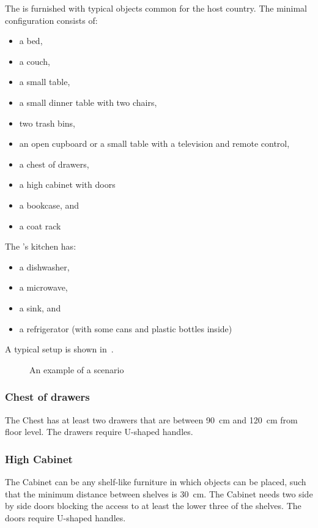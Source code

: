 The \Arena{} is furnished with typical objects common for the host country.
The minimal configuration consists of:
\begin{itemize}
	\item a bed,
	\item a couch,
	\item a small table,
	\item a small dinner table with two chairs,
	\item two trash bins,
	\item an open cupboard or a small table with a television and remote control,
	\item a chest of drawers,
	\item a high cabinet with doors
	\item a bookcase, and
	\item a coat rack
\end{itemize}
The \Arena{}'s kitchen has:
\begin{itemize}
	\item a dishwasher,
	\item a microwave,
	\item a sink, and
	\item a refrigerator (with some cans and plastic bottles inside)
\end{itemize}
A typical \Arena{} setup is shown in~.
\begin{figure}[tbp]
	\centering
	\caption{An example of a \RoboCup\AtHome{} scenario}\label{fig:arena}
\end{figure}

\subsubsection{Chest of drawers}

The Chest has at least two drawers that are between \SI{90}{\centi\meter} and \SI{120}{\centi\meter} from floor level. The drawers require U-shaped handles.

\subsubsection{High Cabinet}

The Cabinet can be any shelf-like furniture in which objects can be placed, such that the minimum distance between shelves is \SI{30}{\centi\meter}. The Cabinet needs two side by side doors blocking the access to at least the lower three of the shelves. The doors require U-shaped handles.

